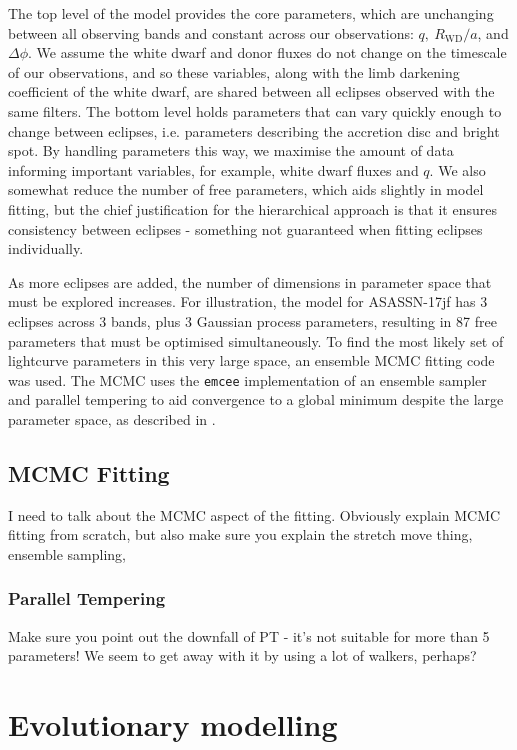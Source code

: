 The top level of the model provides the core parameters, which are unchanging between all observing bands and constant across our observations: $q,\ R_\mathrm{WD}/a$, and $\Delta\phi$. We assume the white dwarf and donor fluxes do not change on the timescale of our observations, and so these variables, along with the limb darkening coefficient of the white dwarf, are shared between all eclipses observed with the same filters. The bottom level holds parameters that can vary quickly enough to change between eclipses, i.e. parameters describing the accretion disc and bright spot. By handling parameters this way, we maximise the amount of data informing important variables, for example, white dwarf fluxes and $q$. We also somewhat reduce the number of free parameters, which aids slightly in model fitting, but the chief justification for the hierarchical approach is that it ensures consistency between eclipses - something not guaranteed when fitting eclipses individually.

As more eclipses are added, the number of dimensions in parameter space that must be explored increases. For illustration, the model for ASASSN-17jf has 3 eclipses across 3 bands, plus 3 Gaussian process parameters, resulting in 87 free parameters that must be optimised simultaneously. To find the most likely set of lightcurve parameters in this very large space, an ensemble MCMC fitting code was used. The MCMC uses the \texttt{emcee} implementation of an ensemble sampler and parallel tempering \citep{foreman2012} to aid convergence to a global minimum despite the large parameter space, as described in \citet{McAllister2019}.




\subsection{MCMC Fitting}
\label{sect:modelling:ensemble MCMC}

I need to talk about the MCMC aspect of the fitting. Obviously explain MCMC fitting from scratch, but also make sure you explain the stretch move thing, ensemble sampling, 

\subsubsection{Parallel Tempering}
Make sure you point out the downfall of PT - it's not suitable for more than 5 parameters! We seem to get away with it by using a lot of walkers, perhaps?


\section{Evolutionary modelling}
\label{sect:method:evolutionary modelling}